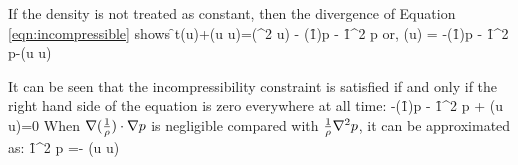 If the density is not treated as constant, then the divergence of Equation \ref{eqn:incompressible} shows
\be
\f{\p }{\p t}(\di \+u)+\di (\+u \cdot \n \+u)=\nu \di (\n^2 \+u) - \n (\f{1}{\rho})\cdot \n p - \f{1}{\rho}\n^2 p
\ee
or,
\be
[\f{\p }{\p t}+\nu \n^2](\di \+u) = -\n (\f{1}{\rho})\cdot \n p - \f{1}{\rho}\n^2 p-\di (\+u \cdot \n \+u)
\ee

It can be seen that the incompressibility constraint is satisfied if and only if the right hand side of the equation is zero everywhere at all time:
\be
-\n (\f{1}{\rho})\cdot \n p - \f{1}{\rho}\n^2 p + \di (\+u \cdot \n \+u)=0
\ee
When $\nabla (\frac{1}{\rho})\cdot \nabla p$ is negligible compared with $\frac{1}{\rho}\nabla^2 p$, it can be approximated as:
\be
\f{1}{\rho}\n^2 p =- \di (\+u \cdot \n \+u)
\label{eqn:pressure-poisson}
\ee


